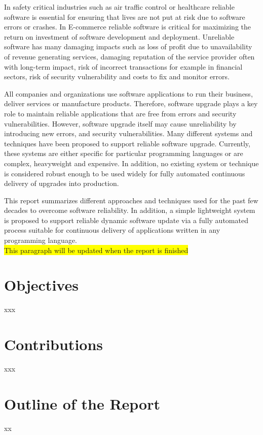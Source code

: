 \documentclass[a4paper,11pt,twoside]{report}
\begin{document}
In safety critical industries such as air traffic control or healthcare reliable software is essential for ensuring that lives are not put at risk due to software errors or crashes. In E-commerce reliable software is critical for maximizing the return on investment of software development and deployment. Unreliable software has many damaging impacts such as loss of profit due to unavailability of revenue generating services, damaging reputation of the service provider often with long-term impact, risk of incorrect transactions for example in financial sectors, risk of security vulnerability and costs to fix and monitor errors.

All companies and organizations use software applications to run their business, deliver services or manufacture products. Therefore, software upgrade plays a key role to maintain reliable applications that are free from errors and security vulnerabilities. However, software upgrade itself may cause unreliability by introducing new errors, and security vulnerabilities. Many different systems and techniques have been proposed to support reliable software upgrade. Currently, these systems are either specific for particular programming languages or are complex, heavyweight and expensive. In addition, no existing system or technique is considered robust enough to be used widely for fully automated continuous delivery of upgrades into production.
 
{\color{red}This report summarizes different approaches and techniques used for the past few decades to overcome software reliability. In addition, a simple lightweight system is proposed to support reliable dynamic software update via a fully automated process suitable for continuous delivery of applications written in any programming language.}\\  
\colorbox{yellow}{This paragraph will be updated when the report is finished}

\section{Objectives}
xxx

\section{Contributions}
xxx

\section{Outline of the Report}
xx
\end{document}
